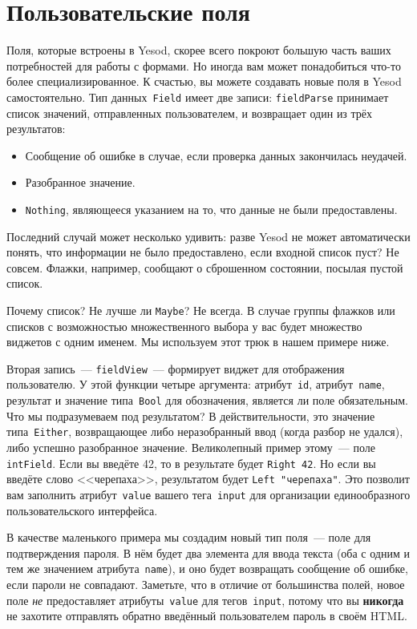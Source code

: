 \section{Пользовательские поля}
Поля, которые встроены в Yesod, скорее всего покроют большую часть ваших
потребностей для работы с формами. Но иногда вам может понадобиться что-то
более специализированное.  К счастью, вы можете создавать новые поля в Yesod
самостоятельно. Тип данных~\lstinline'Field' имеет две записи:
\lstinline'fieldParse' принимает список значений, отправленных пользователем,
и возвращает один из трёх результатов:
\begin{itemize}
    \item Сообщение об ошибке в случае, если проверка данных закончилась неудачей.
    \item Разобранное значение.
    \item \lstinline'Nothing', являющееся указанием на то, что данные не были предоставлены.
\end{itemize}

Последний случай может несколько удивить: разве Yesod не может автоматически
понять, что информации не было предоставлено, если входной список пуст? Не
совсем. Флажки, например, сообщают о сброшенном состоянии, посылая пустой
список.

Почему список? Не лучше ли \lstinline{Maybe}? Не всегда. В случае группы
флажков или списков с возможностью множественного выбора у вас будет
множество виджетов с одним именем. Мы используем этот трюк в нашем примере
ниже.

Вторая запись~--- \lstinline'fieldView'~--- формирует виджет для отображения
пользователю. У этой функции четыре аргумента: атрибут~\texttt{id},
атрибут~\texttt{name}, результат и значение типа~\lstinline'Bool' для
обозначения, является ли поле обязательным.
Что мы подразумеваем под результатом? В действительности, это значение
типа~\lstinline'Either', возвращающее либо неразобранный ввод (когда разбор не
удался), либо успешно разобранное значение. Великолепный пример этому~--- поле
\lstinline'intField'.  Если вы введёте 42, то в результате будет
\lstinline'Right 42'. Но если вы введёте слово <<черепаха>>, результатом будет
\lstinline'Left "черепаха"'. Это позволит вам заполнить атрибут~\texttt{value}
вашего тега~\texttt{input} для организации единообразного пользовательского
интерфейса.

В качестве маленького примера мы создадим новый тип поля~--- поле для
подтверждения пароля. В нём будет два элемента для ввода текста (оба с одним и
тем же значением атрибута~\texttt{name}), и оно будет возвращать сообщение об
ошибке, если пароли не совпадают. Заметьте, что в отличие от большинства
полей, новое поле \emph{не} предоставляет атрибуты~\texttt{value} для
тегов~\texttt{input}, потому что вы \textbf{никогда} не захотите отправлять
обратно введённый пользователем пароль в своём HTML.

